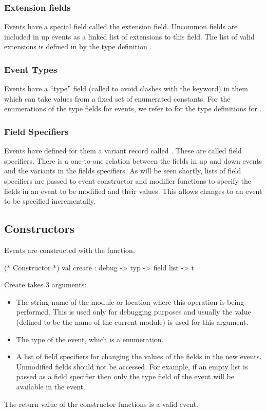 \subsubsection{Extension fields}
Events have a special field called the extension field.  Uncommon fields are
included in up events as a linked list of extensions to this field.  The list
of valid extensions is defined in  by the type definition
.

\subsubsection{Event Types}
Events have a ``type'' field (called  to avoid clashes with the
 keyword) in them which can take values from a fixed set of
enumerated constants.  For the enumerations of the type fields for events, we
refer to  for the type definitions for .

\subsubsection{Field Specifiers}
Events have defined for them a variant record called .  These are
called field specifiers.  There is a one-to-one relation between the fields in
up and down events and the variants in the fields specifiers.  As will be seen
shortly, lists of field specifiers are passed to event constructor and modifier
functions to specify the fields in an event to be modified and their values.
This allows changes to an event to be specified incrementally.

\subsection{Constructors}
Events are constructed with the  function.

\begin{codebox}
  (* Constructor *)
val create	: debug -> typ -> field list -> t
\end{codebox}

Create takes 3 arguments:
\begin{itemize}
\item
The string name of the module or location where this operation is being
performed.  This is used only for debugging purposes and usually the value
 (defined to be the name of the current module) is used for
this argument.
\item
The type of the event, which is a  enumeration.
\item
A list of field specifiers for changing the values of the fields in the new
events.  Unmodified fields should not be accessed.  For example, if an empty
list is passed as a field specifier then only the type field of the event will
be available in the event.
\end{itemize}
The return value of the constructor functions is a valid event.

